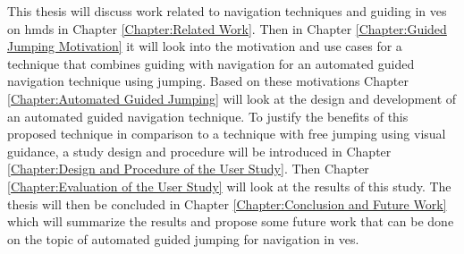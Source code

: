 This thesis will discuss work related to navigation techniques and guiding in \acrshort{ve}s on \acrfull{hmd}s in Chapter \ref{Chapter:Related Work}. Then in Chapter \ref{Chapter:Guided Jumping Motivation} it will look into the motivation and use cases for a technique that combines guiding with navigation for an automated guided navigation technique using jumping. Based on these motivations Chapter \ref{Chapter:Automated Guided Jumping} will look at the design and development of an automated guided navigation technique. To justify the benefits of this proposed technique in comparison to a technique with free jumping using visual guidance, a study design and procedure will be introduced in Chapter \ref{Chapter:Design and Procedure of the User Study}. Then Chapter \ref{Chapter:Evaluation of the User Study} will look at the results of this study. The thesis will then be concluded in Chapter \ref{Chapter:Conclusion and Future Work} which will summarize the results and propose some future work that can be done on the topic of automated guided jumping for navigation in \acrshort{ve}s.
